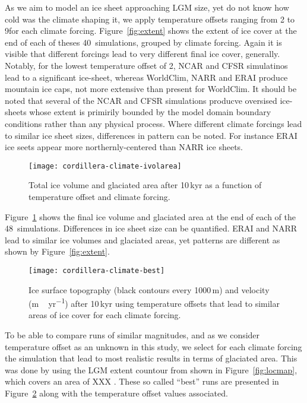 As we aim to model an ice sheet approaching LGM size, yet do not know how cold was the climate shaping it, we apply temperature offsets ranging from 2 to 9\degC for each climate forcing. Figure~\ref{fig:extent} shows the extent of ice cover at the end of each of theses 40~simulations, grouped by climate forcing. Again it is visible that different forcings lead to very different final ice cover, generally. Notably, for the lowest temperature offset of 2\degC, NCAR and CFSR simulatinos lead to a significant ice-sheet, whereas WorldClim, NARR and ERAI produce mountain ice caps, not more extensive than present for WorldClim. It should be noted that several of the NCAR and CFSR simulations producve oversised ice-sheets whose extent is primirily bounded by the model domain boundary conditions rather than any physical process. Where different climate forcings lead to similar ice sheet sizes, differences in pattern can be noted. For instance ERAI ice seets appear more northernly-centered than NARR ice sheets.

\begin{figure}[t]
	\vspace*{2mm}
	\begin{center}
		\texttt{[image: cordillera-climate-ivolarea]}
	\end{center}
	\caption{Total ice volume and glaciated area after 10\,kyr as a function of temperature offset and climate forcing.}
	\label{fig:ivolarea}
\end{figure}

Figure~\ref{fig:ivolarea} shows the final ice volume and glaciated area at the end of each of the 48~simulations. Differences in ice sheet size can be quantified. ERAI and NARR lead to similar ice volumes and glaciated areas, yet patterns are different as shown by Figure~\ref{fig:extent}.

\begin{figure}[t]
	\vspace*{2mm}
	\begin{center}
		\texttt{[image: cordillera-climate-best]}
	\end{center}
	\caption{Ice surface topography (black contours every 1000\,m) and velocity (\unit{m\,yr^{-1}}) after 10\,kyr using temperature offsets that lead to similar areas of ice cover for each climate forcing.}
	\label{fig:best}
\end{figure}

To be able to compare runs of similar magnitudes, and as we consider temperature offset as an unknown in this study, we select for each climate forcing the simulation that lead to most realistic results in terms of glaciated area. This was done by using the LGM extent countour from \needref shown in Figure~\ref{fig:locmap}, which covers an area of XXX . These so called ``best'' runs are presented in Figure~\ref{fig:best} along with the temperature offset values associated.


